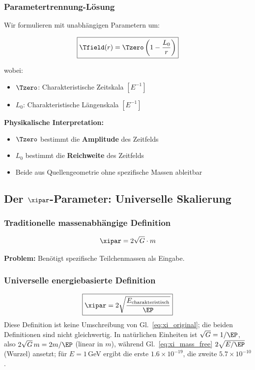 	\subsubsection{Parametertrennung-Lösung}
	
	Wir formulieren mit unabhängigen Parametern um:
	
	\begin{equation}
		\boxed{\Tfield(r) = \Tzero\left(1 - \frac{L_0}{r}\right)}
		\label{eq:point_source_mass_free}
	\end{equation}
	
	wobei:
	\begin{itemize}
		\item $\Tzero$: Charakteristische Zeitskala $[E^{-1}]$
		\item $L_0$: Charakteristische Längenskala $[E^{-1}]$
	\end{itemize}
	
	\textbf{Physikalische Interpretation:}
	\begin{itemize}
		\item $\Tzero$ bestimmt die \textbf{Amplitude} des Zeitfelds
		\item $L_0$ bestimmt die \textbf{Reichweite} des Zeitfelds
		\item Beide aus Quellengeometrie ohne spezifische Massen ableitbar
	\end{itemize}
	
	\subsection{Der $\xipar$-Parameter: Universelle Skalierung}
	\label{subsec:xi_elimination}
	
	\subsubsection{Traditionelle massenabhängige Definition}
	
	\begin{equation}
		\xipar = 2\sqrt{G} \cdot m
		\label{eq:xi_original}
	\end{equation}
	
	\textbf{Problem:} Benötigt spezifische Teilchenmassen als Eingabe.
	
	\subsubsection{Universelle energiebasierte Definition}
	
	\begin{equation}
		\boxed{\xipar = 2\sqrt{\frac{E_{\text{charakteristisch}}}{\EP}}}
		\label{eq:xi_mass_free}
	\end{equation}
	Diese Definition ist keine Umschreibung von Gl.~\eqref{eq:xi_original}; die beiden Definitionen sind nicht gleichwertig. In natürlichen Einheiten ist $\sqrt{G}=1/\EP$, also $2\sqrt{G}\,m=2m/\EP$ (linear in $m$), während Gl.~\eqref{eq:xi_mass_free} $2\sqrt{E/\EP}$ (Wurzel) ansetzt; für $E=1$\,GeV ergibt die erste $1.6\times10^{-19}$, die zweite $5.7\times10^{-10}$.
	
